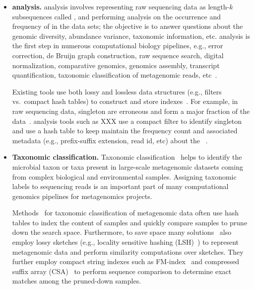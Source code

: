 \begin{itemize}[leftmargin=*]

\item {\bf \Kmer analysis.}
\Kmer analysis involves representing raw sequencing data as length-$k$ subsequences called \kmers, and performing analysis on the occurrence and frequency of \kmers in the data sets; the objective is to answer questions about the genomic diversity, abundance variance, taxonomic information, etc.
\Kmer analysis is the first step in numerous computational biology pipelines, e.g., error correction, de Bruijn graph construction, raw sequence search, digital normalization, comparative genomics, genomics assembly, transcript quantification, taxonomic classification of metagenomic reads, etc~\cite{xxxx}.

Existing tools use both lossy and lossless data structures (e.g., filters vs.\ compact hash tables) to construct and store \kmer indexes~\cite{xxxx}.
For example, in raw sequencing data, singleton \kmers are erroneous and form a major fraction of the data~\cite{xxxx}. \kmer analysis tools such as  XXX use a compact filter to identify singleton \kmers and use a hash table to keep maintain the frequency count and associated metadata (e.g., prefix-suffix extension, read id, etc) about the \kmers~\cite{xxxx}.

\item {\bf Taxonomic classification.} Taxonomic classification~\cite{something} helps to identify the microbial taxon or taxa present in large-scale  metagenomic datasets coming from complex biological and environmental samples. Assigning taxonomic labels to sequencing reads is an important part of many computational genomics pipelines for metagenomics
projects.

Methods~\cite{cite-something} for taxonomic classification of metagenomic data often use hash tables to index the \kmer content of samples and quickly compare samples to prune down the search space.
Furthermore, to save space many solutions~\cite{cite-something} also employ lossy sketches (e.g., locality sensitive hashing (LSH)~\cite{cite-something}) to represent metagenomic data and perform similarity computations over sketches.
They further employ compact string indexes such as FM-index~\cite{fm-index} and compressed suffix array (CSA)~\cite{csa} to perform sequence comparison to determine exact matches among the pruned-down samples.


\end{itemize}
